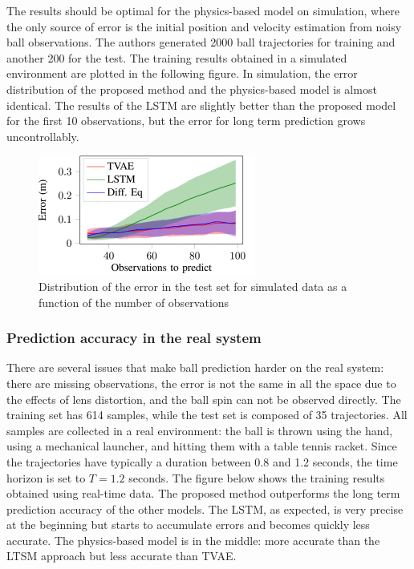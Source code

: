 The results should be optimal for the physics-based model on simulation,
where the only source of error is the initial position and velocity
estimation from noisy ball observations. The authors generated 2000 ball
trajectories for training and another 200 for the test. The training
results obtained in a simulated environment are plotted in the following
figure. In simulation, the error distribution of the proposed method and
the physics-based model is almost identical. The results of the LSTM are
slightly better than the proposed model for the first 10 observations,
but the error for long term prediction grows uncontrollably.

\begin{figure}[h!]
\centering
\includegraphics[width=0.37\linewidth]{images/accuracyballres.png}
\caption{Distribution of the error in the test set for simulated data as a function of the number of observations}
\end{figure}

\subsubsection{Prediction accuracy in the real
system}\label{header-n975}

There are several issues that make ball prediction harder on the real
system: there are missing observations, the error is not the same in all
the space due to the effects of lens distortion, and the ball spin can
not be observed directly. The training set has 614 samples, while the
test set is composed of 35 trajectories. All samples are collected in a
real environment: the ball is thrown using the hand, using a mechanical
launcher, and hitting them with a table tennis racket. Since the
trajectories have typically a duration between 0.8 and 1.2 seconds, the
time horizon is set to $T = 1.2$ seconds. The figure below shows the
training results obtained using real-time data. The proposed method
outperforms the long term prediction accuracy of the other models. The
LSTM, as expected, is very precise at the beginning but starts to
accumulate errors and becomes quickly less accurate. The physics-based
model is in the middle: more accurate than the LTSM approach but less
accurate than TVAE.

